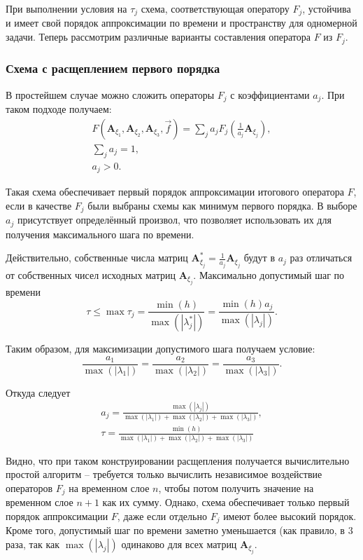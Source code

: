 При выполнении условия на $\tau_j$ схема, соответствующая оператору $F_j$, устойчива и имеет свой порядок аппроксимации по времени и пространству для одномерной задачи. Теперь рассмотрим различные варианты составления оператора $F$ из $F_j$.


\subsubsection{Схема с расщеплением первого порядка}

В простейшем случае можно сложить операторы $F_j$ с коэффициентами $a_j$. При таком подходе получаем:
\begin{eqnarray}
F(\mathbf A_{\xi_1}, \mathbf A_{\xi_2}, \mathbf A_{\xi_3}, \vec f) = \sum\limits_{j} a_j F_j(\frac{1}{a_j} \mathbf A_{\xi_j}), \nonumber\\
\sum\limits_{j} a_j = 1, \nonumber\\
a_j > 0.
\end{eqnarray}

Такая схема обеспечивает первый порядок аппроксимации итогового оператора $F$, если в качестве $F_j$ были выбраны схемы как минимум первого порядка. В выборе $a_j$ присутствует определённый произвол, что позволяет использовать их для получения максимального шага по времени.

Действительно, собственные числа матриц $\mathbf A_{\xi_j}^* = \frac{1}{a_j} \mathbf A_{\xi_j}$ будут в $a_j$ раз отличаться от собственных чисел исходных матриц $\mathbf A_{\xi_j}$. Максимально допустимый шаг по времени
\begin{equation}
\tau \le \max{\tau_j} = \frac{\min(h)}{\max(|\lambda_j^*|)} = \frac{\min(h)a_j}{\max(|\lambda_j|)}.
\end{equation}

Таким образом, для максимизации допустимого шага получаем условие:
\begin{equation}
\frac{a_1}{\max(|\lambda_1|)} = \frac{a_2}{\max(|\lambda_2|)} = \frac{a_3}{\max(|\lambda_3|)}.
\end{equation}

Откуда следует
\begin{eqnarray}
a_j = \frac{\max(|\lambda_j|)}{\max(|\lambda_1|)+\max(|\lambda_2|)+\max(|\lambda_3|)},\nonumber\\
\tau = \frac{\min(h)}{\max(|\lambda_1|)+\max(|\lambda_2|)+\max(|\lambda_3|)}
\end{eqnarray}

Видно, что при таком конструировании расщепления получается вычислительно простой алгоритм -- требуется только вычислить независимое воздействие операторов $F_j$ на временном слое $n$, чтобы потом получить значение на временном слое $n+1$ как их сумму. Однако, схема обеспечивает только первый порядок аппроксимации $F$, даже если отдельно $F_j$ имеют более высокий порядок. Кроме того, допустимый шаг по времени заметно уменьшается (как правило, в 3 раза, так как $\max(|\lambda_j|)$ одинаково для всех матриц $\mathbf A_{\xi_j}$.


